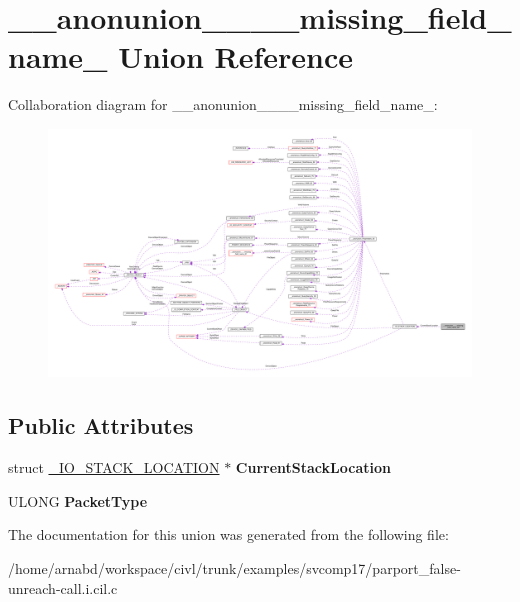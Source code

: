 \hypertarget{union____anonunion________missing__field__name__52}{}\section{\+\_\+\+\_\+anonunion\+\_\+\+\_\+\+\_\+\+\_\+missing\+\_\+field\+\_\+name\+\_ Union Reference}
\label{union____anonunion________missing__field__name__52}


Collaboration diagram for \+\_\+\+\_\+anonunion\+\_\+\+\_\+\+\_\+\+\_\+missing\+\_\+field\+\_\+name\+\_\+:
\nopagebreak
\begin{figure}[H]
\begin{center}
\leavevmode
\includegraphics[width=350pt]{union____anonunion________missing__field__name__52__coll__graph}
\end{center}
\end{figure}
\subsection*{Public Attributes}
\begin{DoxyCompactItemize}
\item 
\hypertarget{union____anonunion________missing__field__name__52_aa194cc05300b1dfaf8a899389618549d}{}struct \hyperlink{struct__IO__STACK__LOCATION}{\+\_\+\+I\+O\+\_\+\+S\+T\+A\+C\+K\+\_\+\+L\+O\+C\+A\+T\+I\+O\+N} $\ast$ {\bfseries Current\+Stack\+Location}\label{union____anonunion________missing__field__name__52_aa194cc05300b1dfaf8a899389618549d}

\item 
\hypertarget{union____anonunion________missing__field__name__52_a54207df33e4a6fed30c353462c7dd7c0}{}U\+L\+O\+N\+G {\bfseries Packet\+Type}\label{union____anonunion________missing__field__name__52_a54207df33e4a6fed30c353462c7dd7c0}

\end{DoxyCompactItemize}


The documentation for this union was generated from the following file\+:\begin{DoxyCompactItemize}
\item 
/home/arnabd/workspace/civl/trunk/examples/svcomp17/parport\+\_\+false-\/unreach-\/call.\+i.\+cil.\+c\end{DoxyCompactItemize}
